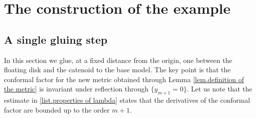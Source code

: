 \documentclass[reqno]{amsart}
\theoremstyle{definition}
\theoremstyle{remark}
\numberwithin{equation}{section}
\begin{document}
\section{The construction of the example}

\subsection{A single gluing step}\label{subsec.single gluing}

In this section we glue, at a fixed distance from the origin, one between the floating disk and the catenoid to the base model. The key point is that the conformal factor for the new metric obtained through Lemma \ref{lem.definition of the metric} is invariant under reflection through $\{y_{m+1}=0\}$. Let us note that the estimate in \ref{list.properties of lambda} states that the derivatives of the conformal factor are bounded up to the  order $m+1$.
\end{document}
